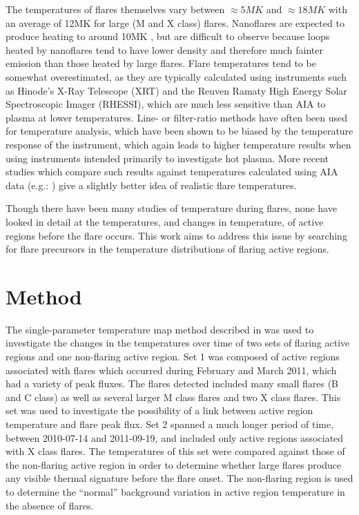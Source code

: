 \documentclass{article}
\begin{document}
The temperatures of flares themselves vary between $\approx5MK$ and $\approx18MK$ with an average of 12MK for large (M and X class) flares.
Nanoflares are expected to produce heating to around 10MK \citep{Reale2011a}, but are difficult to observe because loops heated by nanoflares tend to have lower density and therefore much fainter emission than those heated by large flares.
Flare temperatures tend to be somewhat overestimated, as they are typically calculated using instruments such as Hinode's X-Ray Telescope (XRT) and the Reuven Ramaty High Energy Solar Spectroscopic Imager (RHESSI), which are much less sensitive than AIA to plasma at lower temperatures.
Line- or filter-ratio methods have often been used for temperature analysis, which have been shown to be biased by the temperature response of the instrument, which again leads to higher temperature results when using instruments intended primarily to investigate hot plasma.
More recent studies which compare such results against temperatures calculated using AIA data (e.g.: \citet{Ryan2013,Ryan2014}) give a slightly better idea of realistic flare temperatures.

Though there have been many studies of temperature during flares, none have looked in detail at the temperatures, and changes in temperature, of active regions before the flare occurs.
This work aims to address this issue by searching for flare precursors in the temperature distributions of flaring active regions.


\section{Method}

The single-parameter temperature map method described in \cite{Leonard2014} was used to investigate the changes in the temperatures over time of two sets of flaring active regions and one non-flaring active region.
Set 1 was composed of active regions associated with flares which occurred during February and March 2011, which had a variety of peak fluxes.
The flares detected included many small flares (B and C class) as well as several larger M class flares and two X class flares.
This set was used to investigate the possibility of a link between active region temperature and flare peak flux.
Set 2 spanned a much longer period of time, between 2010-07-14 and 2011-09-19, and included only active regions associated with X class flares.
The temperatures of this set were compared against those of the non-flaring active region in order to determine whether large flares produce any visible thermal signature before the flare onset.
The non-flaring region is used to determine the ``normal'' background variation in active region temperature in the absence of flares.
\end{document}
